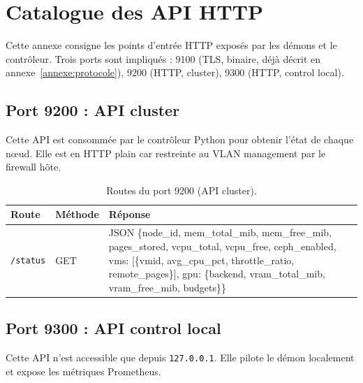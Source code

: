 \chapter{Catalogue des API HTTP}
\label{annexe:api}

Cette annexe consigne les points d'entrée HTTP exposés par les démons et le contrôleur. Trois ports sont impliqués : 9100 (TLS, binaire, déjà décrit en annexe~\ref{annexe:protocole}), 9200 (HTTP, cluster), 9300 (HTTP, control local).

\section{Port 9200 : API cluster}

Cette API est consommée par le contrôleur Python pour obtenir l'état de chaque nœud. Elle est en HTTP plain car restreinte au VLAN management par le firewall hôte.

\begin{table}[H]
\centering
\small
\caption{Routes du port 9200 (API cluster).}
\begin{tabular}{lp{2.5cm}p{8cm}}
\toprule
\textbf{Route} & \textbf{Méthode} & \textbf{Réponse} \\
\midrule
\texttt{/status}      & GET & JSON \{node\_id, mem\_total\_mib, mem\_free\_mib, pages\_stored, vcpu\_total, vcpu\_free, ceph\_enabled, vms: [\{vmid, avg\_cpu\_pct, throttle\_ratio, remote\_pages\}], gpu: \{backend, vram\_total\_mib, vram\_free\_mib, budgets\}\} \\
\bottomrule
\end{tabular}

\end{table}

\section{Port 9300 : API control local}

Cette API n'est accessible que depuis \texttt{127.0.0.1}. Elle pilote le démon localement et expose les métriques Prometheus.


